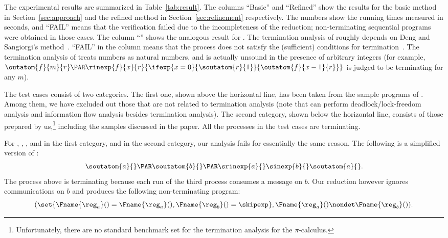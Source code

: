 The experimental results are summarized in Table~\ref{tab:result}.
The columns ``Basic'' and ``Refined'' show the results for
the basic method in Section~\ref{sec:approach}
and the refined method in Section~\ref{sec:refinement} respectively.
The numbers show the running times measured in seconds, and
``FAIL'' means that the verification failed due to the incompleteness of
the reduction; non-terminating sequential programs were obtained in those cases.
The column ``\typical{}'' shows the analogous result for \typical{}.
The termination analysis of \typical{} roughly depends on Deng and Sangiorgi's
method~\cite{Deng06IC}. ``FAIL'' in the column means that the process does not
satisfy the (sufficient) conditions for termination~\cite{Deng06IC}.
The termination analysis of \typical{} treats numbers as natural numbers,
and is actually unsound in the presence of arbitrary integers
(for example, \(\outatom{f}{m}{r}\PAR
\rinexp{f}{x}{r}{\ifexp{x=0}{\soutatom{r}{1}}{\outatom{f}{x-1}{r}}}\) is
judged to be terminating for any \(m\)).

The test cases consist of two categories. The first one, shown above
the horizontal line, has been taken from the sample programs of \typical{}.
Among them, we have excluded out those that are not
related to termination analysis (note that \typical{} can perform deadlock/lock-freedom
analysis and information flow analysis besides termination analysis).
The second category, shown below the horizontal line, consists of those prepared by
us,\footnote{Unfortunately, there are no
  standard benchmark set for the termination analysis for the \(\pi\)-calculus.}
including the samples discussed in the paper.
All the processes in the test cases are terminating.


For , , ,
and  in the first category, and 
in the second category,
our analysis fails for essentially the same reason.
The following is a simplified version of :
\[
\soutatom{a}{} \PAR \soutatom{b}{} \PAR \srinexp{a}{}\sinexp{b}{}\soutatom{a}{}.
\]
The process above is terminating because each run of the third process consumes
a message on \(b\). Our reduction however ignores communications on \(b\) and produces
the following non-terminating program:
\[
(\set{\Fname{\reg_a}()=\Fname{\reg_a}(), \Fname{\reg_b}()=\skipexp}, \Fname{\reg_a}()\nondet
\Fname{\reg_b}()).
\]




